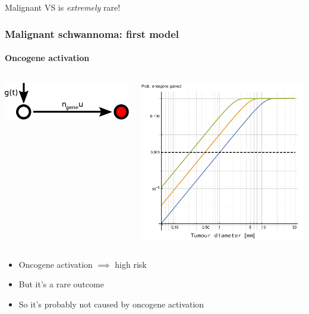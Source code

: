 \documentclass{beamer}
\begin{document}
\begin{frame}

    \begin{center}
        Malignant VS is \emph{extremely} rare!
    \end{center}

\end{frame}

\begin{frame}
    \frametitle{Malignant schwannoma: first model}
    \framesubtitle{Oncogene activation}
    \begin{columns}
        \begin{column}{0.5\textwidth}
        \includegraphics[width=\textwidth]{figures/malignancy-oncogene.pdf}
        \end{column}
        \begin{column}{0.5\textwidth}
        \includegraphics[width=\textwidth]{figures/DiameterOncogene-feb21}
        \end{column}
    \end{columns}

\begin{itemize}
    \item Oncogene activation $\implies$ high risk
    \item But it's a rare outcome
    \item So it's probably not caused by oncogene activation
\end{itemize}

\end{frame}
\end{document}
